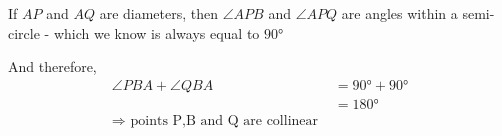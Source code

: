 \begin{solution}[\halfpage]
	If $AP$ and $AQ$ are diameters, then $\angle APB$ and $\angle APQ$ are angles
	within a semi-circle - which we know is always equal to $\ang{90}$
	
	And therefore, 
	\begin{align}
		\angle PBA + \angle QBA &= \ang{90} + \ang{90} \\
		                        &= \ang{180} \\
		     \Rightarrow \text{ points P,B and Q are collinear }
	\end{align}
\end{solution}

